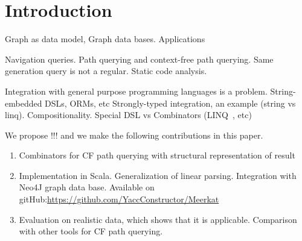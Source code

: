 \section{Introduction}

Graph as data model, Graph data bases.
Applications

Navigation queries.
Path querying and context-free path querying.
Same generation query is not a regular.
Static code analysis.

Integration with general purpose programming languages is a problem.
String-embedded DSLs, ORMs, etc
Strongly-typed integration, an example (string vs linq).
Compositionality.
Special DSL vs Combinators (LINQ~\cite{LINQ1, LINQ2}, etc)~\cite{ScalaGraphParsing}

We propose !!! and we make the following contributions in this paper.
\begin{enumerate}
\item Combinators for CF path querying with structural representation of result
\item Implementation in Scala. Generalization of linear parsing. Integration with Neo4J graph data base. Available on gitHub:\url{https://github.com/YaccConstructor/Meerkat}
\item Evaluation on realistic data, which shows that it is applicable. Comparison  with other tools 
for CF path querying.
\end{enumerate}
